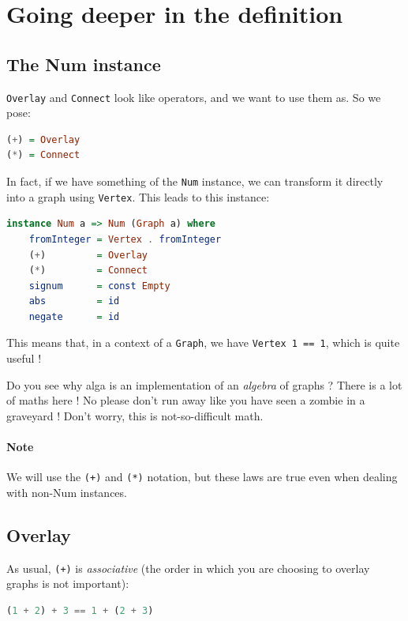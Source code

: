 \documentclass[10pt,a4paper]{article}
\begin{document}
\section{Going deeper in the definition}

\subsection{The Num instance}
\verb|Overlay| and \verb|Connect| look like operators, and we want to use them as. So we pose:

\begin{lstlisting}[language=Haskell, frame=single]
(+) = Overlay
(*) = Connect
\end{lstlisting}

In fact, if we have something of the \verb|Num| instance, we can transform it directly into a graph using \verb|Vertex|. This leads to this instance:

\begin{lstlisting}[language=Haskell, frame=single]
instance Num a => Num (Graph a) where
	fromInteger = Vertex . fromInteger
	(+)         = Overlay
	(*)         = Connect
	signum      = const Empty
	abs         = id
	negate      = id
\end{lstlisting}

This means that, in a context of a \verb|Graph|, we have \verb|Vertex 1 == 1|, which is quite useful !

Do you see why alga is an implementation of an \emph{algebra} of graphs ? There is a lot of maths here ! No please don't run away like you have seen a zombie in a graveyard ! Don't worry, this is not-so-difficult math.

\paragraph{Note}
We will use the \verb|(+)| and \verb|(*)| notation, but these laws are true even when dealing with non-Num instances.

\subsection{Overlay}

As usual, \verb|(+)| is \emph{associative} (the order in which you are choosing to overlay graphs is not important):
\begin{lstlisting}[language=Haskell, frame=single]
(1 + 2) + 3 == 1 + (2 + 3)
\end{lstlisting}
\end{document}
